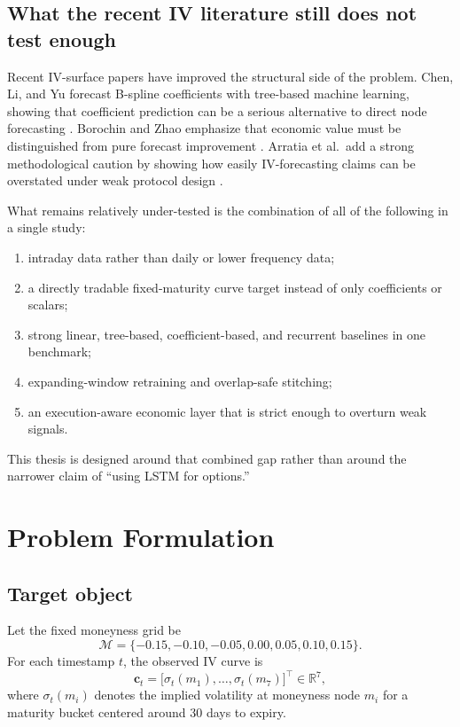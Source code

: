 \documentclass[12pt]{report}
\begin{document}
\section{What the recent IV literature still does not test enough}
Recent IV-surface papers have improved the structural side of the problem. Chen, Li, and Yu forecast B-spline coefficients with tree-based machine learning, showing that coefficient prediction can be a serious alternative to direct node forecasting \citep{chen2024bspline}. Borochin and Zhao emphasize that economic value must be distinguished from pure forecast improvement \citep{borochin2025}. Arratia et al.\ add a strong methodological caution by showing how easily IV-forecasting claims can be overstated under weak protocol design \citep{arratia2025}.

What remains relatively under-tested is the combination of all of the following in a single study:
\begin{enumerate}[leftmargin=1.3cm]
    \item intraday data rather than daily or lower frequency data;
    \item a directly tradable fixed-maturity curve target instead of only coefficients or scalars;
    \item strong linear, tree-based, coefficient-based, and recurrent baselines in one benchmark;
    \item expanding-window retraining and overlap-safe stitching;
    \item an execution-aware economic layer that is strict enough to overturn weak signals.
\end{enumerate}

This thesis is designed around that combined gap rather than around the narrower claim of ``using LSTM for options.''

\chapter{Problem Formulation}

\section{Target object}
Let the fixed moneyness grid be
\[
\mathcal{M}=\{-0.15,-0.10,-0.05,0.00,0.05,0.10,0.15\}.
\]
For each timestamp \(t\), the observed IV curve is
\[
\mathbf{c}_t = \big[\sigma_t(m_1), \ldots, \sigma_t(m_7)\big]^\top \in \mathbb{R}^7,
\]
where \(\sigma_t(m_i)\) denotes the implied volatility at moneyness node \(m_i\) for a maturity bucket centered around 30 days to expiry.
\end{document}
